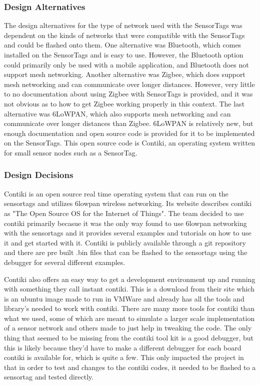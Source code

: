 \documentclass[PPFS.tex]{template/subfiles}
\begin{document}
\subsubsection{Design Alternatives}
The design alternatives for the type of network used with the SensorTags was dependent on the kinds of networks that were compatible with the SensorTags and could be flashed onto them. One alternative was Bluetooth, which comes installed on the SensorTags and is easy to use. However, the Bluetooth option could primarily only be used with a mobile application, and Bluetooth does not support mesh networking. Another alternative was Zigbee, which does support mesh networking and can communicate over longer distances. However, very little to no documentation about using Zigbee with SensorTags is provided, and it was not obvious as to how to get Zigbee working properly in this context. The last alternative was 6LoWPAN, which also supports mesh networking and can communicate over longer distances than Zigbee. 6LoWPAN is relatively new, but enough documentation and open source code is provided for it to be implemented on the SensorTags. This open source code is Contiki, an operating system written for small sensor nodes such as a SensorTag.

\subsubsection{Design Decisions}
Contiki is an open source real time operating system that can run on the sensortags and utilizes 6lowpan wireless networking. Its website describes contiki as "The Open Source OS for the Internet of Things". The team decided to use contiki primarily becasue it was the only way found to use 6lowpan networking with the sensortags and it provides several examples and tutorials on how to use it and get started with it. Contiki is publicly available through a git repository and there are pre built .bin files that can be flashed to the sensortags using the debugger for several different examples. 

Contiki also offers an easy way to get a development environment up and running with something they call instant contiki. This is a download from their site which is an ubuntu image made to run in VMWare and already has all the tools and library's needed to work with contiki. There are many more tools for contiki than what we used, some of which are meant to simulate a larger scale implementation of a sensor network and others made to just help in tweaking the code. The only thing that seemed to be missing from the contiki tool kit is a good debugger, but this is likely because they'd have to make a different debugger for each board contiki is available for, which is quite a few. This only impacted the project in that in order to test and changes to the contiki codes, it needed to be flashed to a sensortag and tested directly. 
\end{document}
